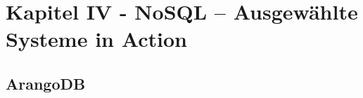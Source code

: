 \chapter{Kapitel IV - NoSQL – Ausgewählte Systeme in Action}
\setcounter{section}{7}
\section{ArangoDB}